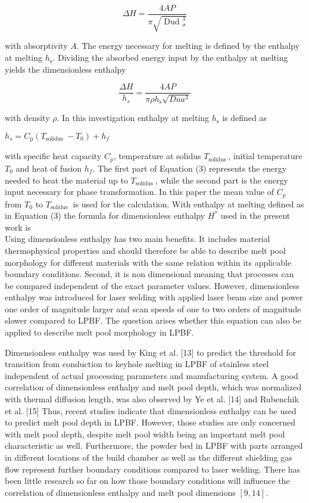 \documentclass[10pt]{article}
\begin{document}
\begin{equation*}
\Delta H=\frac{4 A P}{\pi \sqrt{\text { Dud }_{\sigma}^{3}}} \tag{1}
\end{equation*}


with absorptivity $A$. The energy necessary for melting is defined by the enthalpy at melting $h_{\mathrm{s}}$. Dividing the absorbed energy input by the enthalpy at melting yields the dimensionless enthalpy


\begin{equation*}
\frac{\Delta H}{h_{s}}=\frac{4 A P}{\pi \rho h_{\mathrm{s}} \sqrt{D u a^{3}}} \tag{2}
\end{equation*}


with density $\rho$. In this investigation enthalpy at melting $h_{\mathrm{s}}$ is defined as

$h_{s}=C_{\mathrm{p}}\left(T_{\text {solidus }}-T_{0}\right)+h_{f}$

with specific heat capacity $C_{p}$, temperature at solidus $T_{\text {solidus }}$, initial temperature $T_{0}$ and heat of fusion $h_{f}$. The first part of Equation (3) represents the energy needed to heat the material up to $T_{\text {solidus }}$, while the second part is the energy input necessary for phase transformation. In this paper the mean value of $C_{p}$ from $T_{0}$ to $T_{\text {solidus }}$ is used for the calculation. With enthalpy at melting defined as in Equation (3) the formula for dimensionless enthalpy $H^{*}$ used in the present work is\\
Using dimensionless enthalpy has two main benefits. It includes material thermophysical properties and should therefore be able to describe melt pool morphology for different materials with the same relation within its applicable boundary conditions. Second, it is non dimensional meaning that processes can be compared independent of the exact parameter values. However, dimensionless enthalpy was introduced for laser welding with applied laser beam size and power one order of magnitude larger and scan speeds of one to two orders of magnitude slower compared to LPBF. The question arises whether this equation can also be applied to describe melt pool morphology in LPBF.

Dimensionless enthalpy was used by King et al. [13] to predict the threshold for transition from conduction to keyhole melting in LPBF of stainless steel independent of actual processing parameters and manufacturing system. A good correlation of dimensionless enthalpy and melt pool depth, which was normalized with thermal diffusion length, was also observed by Ye et al. [14] and Rubenchik et al. [15] Thus, recent studies indicate that dimensionless enthalpy can be used to predict melt pool depth in LPBF. However, those studies are only concerned with melt pool depth, despite melt pool width being an important melt pool characteristic as well. Furthermore, the powder bed in LPBF with parts arranged in different locations of the build chamber as well as the different shielding gas flow represent further boundary conditions compared to laser welding. There has been little research so far on how those boundary conditions will influence the correlation of dimensionless enthalpy and melt pool dimensions $[9,14]$.
\end{document}
